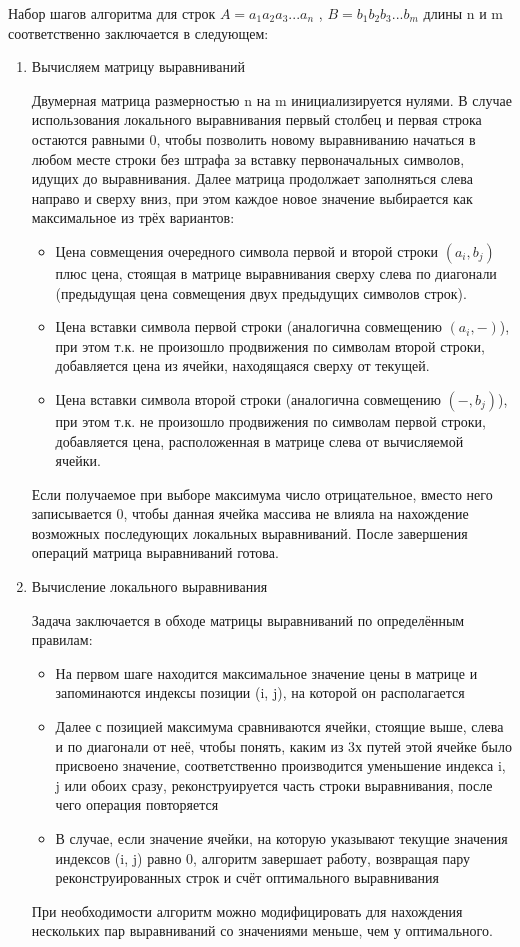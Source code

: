 Набор шагов алгоритма для строк $A = a_1 a_2 a_3 ... a_n$ , $B = b_1 b_2 b_3 ... b_m$ длины n и m соответственно заключается в следующем:
\begin {enumerate}
	\item Вычисляем матрицу выравниваний

	Двумерная матрица размерностью n на m инициализируется нулями. В случае использования локального выравнивания первый столбец и первая строка остаются равными 0, чтобы позволить новому выравниванию начаться в любом месте строки без штрафа за вставку первоначальных символов, идущих до выравнивания. Далее матрица продолжает заполняться слева направо и сверху вниз, при этом каждое новое значение выбирается как максимальное из трёх вариантов:
	\begin {itemize}
		\item Цена совмещения очередного символа первой и второй строки $(a_i, b_j)$ плюс цена, стоящая в матрице выравнивания сверху слева по диагонали (предыдущая цена совмещения двух предыдущих символов строк).
		\item Цена вставки символа первой строки (аналогична совмещению $(a_i, -)$), при этом т.к. не произошло продвижения по символам второй строки, добавляется цена из ячейки, находящаяся сверху от текущей.
		\item Цена вставки символа второй строки (аналогична совмещению $(-, b_j)$), при этом т.к. не произошло продвижения по символам первой строки, добавляется цена, расположенная в матрице слева от вычисляемой ячейки.
	\end {itemize}
	Если получаемое при выборе максимума число отрицательное, вместо него записывается 0, чтобы данная ячейка массива не влияла на нахождение возможных последующих локальных выравниваний.
	После завершения операций матрица выравниваний готова.
	\item Вычисление локального выравнивания

	Задача заключается в обходе матрицы выравниваний по определённым правилам:
	\begin {itemize}
		\item На первом шаге находится максимальное значение цены в матрице и запоминаются индексы позиции (i, j), на которой он располагается
		\item Далее с позицией максимума сравниваются ячейки, стоящие выше, слева и по диагонали от неё, чтобы понять, каким из 3х путей этой ячейке было присвоено значение, соответственно производится уменьшение индекса i, j или обоих сразу, реконструируется часть строки выравнивания, после чего операция повторяется
		\item В случае, если значение ячейки, на которую указывают текущие значения индексов (i, j) равно 0, алгоритм завершает работу, возвращая пару реконструированных строк и счёт оптимального выравнивания
	\end {itemize}
	При необходимости алгоритм можно модифицировать для нахождения нескольких пар выравниваний со значениями меньше, чем у оптимального.
\end {enumerate}

